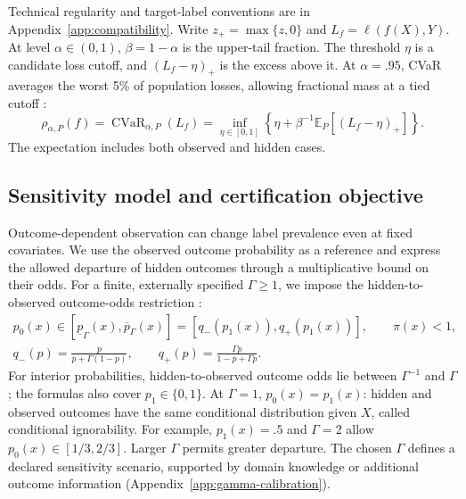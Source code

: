 Technical regularity and target-label conventions are in Appendix~\ref{app:compatibility}. Write \(z_+=\max\{z,0\}\) and \(L_f=\ell(f(X),Y)\). At level \(\alpha\in(0,1)\), \(\beta=1-\alpha\) is the upper-tail fraction. The threshold \(\eta\) is a candidate loss cutoff, and \((L_f-\eta)_+\) is the excess above it. At \(\alpha=.95\), CVaR averages the worst 5\% of population losses, allowing fractional mass at a tied cutoff \citep{rockafellar2002conditional}:
\begin{equation}
 \rho_{\alpha,P}(f)=\operatorname{CVaR}_{\alpha,P}(L_f)
 =\inf_{\eta\in[0,1]}\left\{\eta+\beta^{-1}\mathbb E_P[(L_f-\eta)_+]\right\}.
\label{eq:cvar-definition}
\end{equation}
The expectation includes both observed and hidden cases.

\subsection{Sensitivity model and certification objective}
\label{sec:sensitivity}
Outcome-dependent observation can change label prevalence even at fixed covariates. We use the observed outcome probability as a reference and express the allowed departure of hidden outcomes through a multiplicative bound on their odds. For a finite, externally specified \(\Gamma\ge1\), we impose the hidden-to-observed outcome-odds restriction \citep[Section~7.2]{zhao2019sensitivity}:
\begin{equation}
\begin{gathered}
 p_0(x)\in[\underline p_\Gamma(x),\overline p_\Gamma(x)]
 =[q_-(p_1(x)),q_+(p_1(x))],\qquad \pi(x)<1,\\
 q_-(p)=\frac{p}{p+\Gamma(1-p)},
 \qquad q_+(p)=\frac{\Gamma p}{1-p+\Gamma p}.
\end{gathered}
\label{eq:sensitivity-model}
\end{equation}
For interior probabilities, hidden-to-observed outcome odds lie between \(\Gamma^{-1}\) and \(\Gamma\); the formulas also cover \(p_1\in\{0,1\}\). At \(\Gamma=1\), \(p_0(x)=p_1(x)\): hidden and observed outcomes have the same conditional distribution given \(X\), called conditional ignorability. For example, \(p_1(x)=.5\) and \(\Gamma=2\) allow \(p_0(x)\in[1/3,2/3]\). Larger \(\Gamma\) permits greater departure. The chosen \(\Gamma\) defines a declared sensitivity scenario, supported by domain knowledge or additional outcome information (Appendix~\ref{app:gamma-calibration}).

